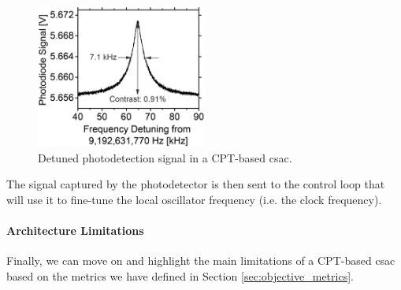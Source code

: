 \begin{figure}[H]
    \centering
    \includegraphics[width=0.5\textwidth, max width=0.8\linewidth]{img/CPT-transmission-signal.png}
    \caption{Detuned photodetection signal in a CPT-based \acrshort{csac}.}
    \label{fig:CPT-transmission}
\end{figure}

The signal captured by the photodetector is then sent to the control loop that will use it to fine-tune the local oscillator frequency (i.e. the clock frequency).


\paragraph{Architecture Limitations}

Finally, we can move on and highlight the main limitations of a CPT-based \acrshort{csac} based on the metrics we have defined in Section \ref{sec:objective_metrics}.

